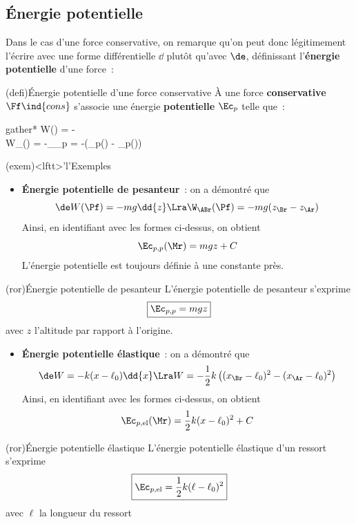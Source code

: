 \documentclass[../../main/main.tex]{subfiles}
\begin{document}
\subsection{Énergie potentielle}
Dans le cas d'une force conservative, on remarque qu'on peut donc légitimement
l'écrire avec une forme différentielle $\dd$ plutôt qu'avec $\de$, définissant
l'\textbf{énergie potentielle} d'une force~:
\begin{tcb*}(defi){Énergie potentielle d'une force conservative}
	À une force \textbf{conservative} $\Ff\ind{cons}$ s'associe une énergie
	\textbf{potentielle} $\Ec_p$ telle que~:
	\begin{empheq}[box=\fbox]{gather*}
		\de W(\Ff{}) = -
		\\\Lra
		W_{\ABr}(\Ff{}) = -\D_{\ABr}\Ec_p = -(\Ec_p(\Br) - \Ec_p(\Ar))
	\end{empheq}
\end{tcb*}

\begin{tcb*}(exem)<lftt>'l'{Exemples}
	\begin{itemize}
		\item \textbf{Énergie potentielle de pesanteur}~: on a démontré que
		      \[
			      \de W(\Pf) = -mg\dd{z}
			      \Lra
			      \W_{\ABr}(\Pf) = -mg(z_\Br - z_\Ar)
		      \]
		      Ainsi, en identifiant avec les formes ci-dessus, on obtient
		      \[\Ec_{p,p}(\Mr) = mgz + C\]
		      L'énergie potentielle est toujours définie à une constante près.
	\end{itemize}
	\begin{tcb*}(ror){Énergie potentielle de pesanteur}
		L'énergie potentielle de pesanteur s'exprime
		\[\boxed{\Ec_{p,p} = mgz}\]
		avec $z$ l'altitude par rapport à l'origine.
	\end{tcb*}
	\begin{itemize}
		\item \textbf{Énergie potentielle élastique}~: on a démontré que
		      \[
			      \de W = -k(x-\ell_0)\dd{x}
			      \Lra
			      W = -\frac{1}{2}k \left( (x_\Br - \ell_0)^2 - (x_\Ar
			      -\ell_0)^2\right)
		      \]
		      Ainsi, en identifiant avec les formes ci-dessus, on obtient
		      \[\Ec_{p,\rm el}(\Mr) = \frac{1}{2}k(x-\ell_0)^2 + C\]
	\end{itemize}
	\begin{tcb*}(ror){Énergie potentielle élastique}
		L'énergie potentielle élastique d'un ressort s'exprime
		\[\boxed{\Ec_{p,\rm el} = \frac{1}{2}k(\ell-\ell_0)^2}\]
		avec $\ell$ la longueur du ressort
	\end{tcb*}
\end{tcb*}
\end{document}
